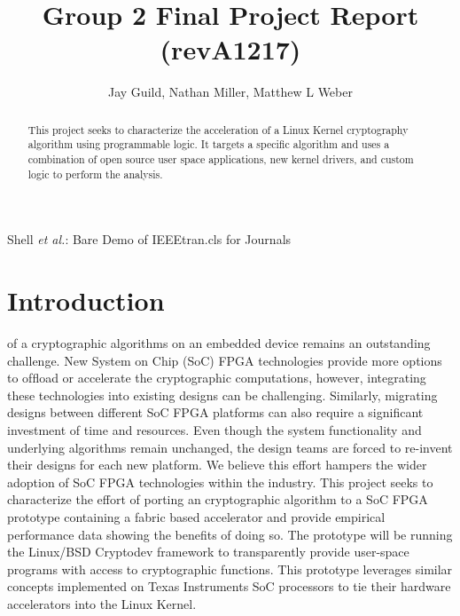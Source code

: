 \documentclass[journal]{IEEEtran}
\begin{document}
\title{Group 2 Final Project Report (revA1217)}
\author{Jay Guild, Nathan Miller, Matthew L Weber}

%
{Shell \MakeLowercase{\textit{et al.}}: Bare Demo of IEEEtran.cls for Journals}
% 

\maketitle

\begin{abstract}
This project seeks to characterize the acceleration of a Linux Kernel cryptography algorithm using programmable logic. It targets a specific algorithm and uses a combination of open source user space applications, new kernel drivers, and custom logic to perform the analysis.
\end{abstract}


\IEEEpeerreviewmaketitle

\section{Introduction}
 of a cryptographic algorithms on an embedded device remains an outstanding challenge. New System on Chip (SoC) FPGA technologies provide more options to ofﬂoad or accelerate the cryptographic computations, however, integrating these technologies into existing designs can be challenging. Similarly, migrating designs between different SoC FPGA platforms can also require a signiﬁcant investment of time and resources. Even though the system functionality and underlying algorithms remain unchanged, the design teams are forced to re-invent their designs for each new platform. We believe this effort hampers the wider adoption of SoC FPGA technologies within the industry.  This project seeks to characterize the effort of porting an cryptographic algorithm to a SoC FPGA prototype containing a fabric based accelerator and provide empirical performance data showing the beneﬁts of doing so. The prototype will be running the Linux/BSD Cryptodev framework to transparently provide user-space programs with access to cryptographic functions. This prototype leverages similar concepts implemented on Texas Instruments SoC processors to tie their hardware accelerators into the Linux Kernel.
\end{document}
